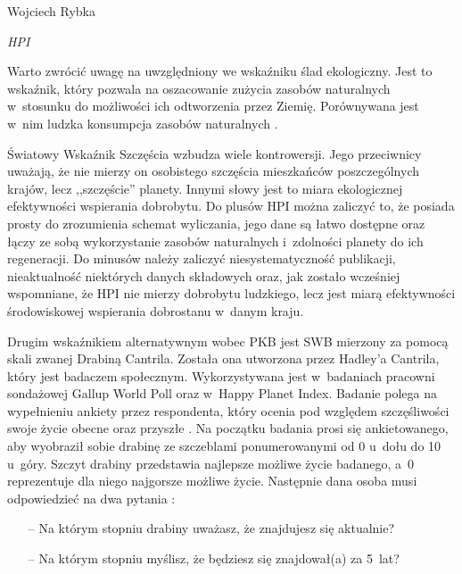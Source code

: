 \begin{artplenv}{Wojciech Rybka}
\begin{footnotesize}
\begin{widerequation}
\textit{HPI}\ {\approx}\ 
\end{widerequation}
\end{footnotesize}

Warto zwrócić uwagę na uwzględniony we wskaźniku ślad ekologiczny. Jest to wskaźnik, który pozwala na oszacowanie
zużycia zasobów naturalnych w~stosunku do możliwości ich odtworzenia przez Ziemię. Porównywana jest w~nim ludzka
konsumpcja zasobów naturalnych
\parencite{noauthor_about_2019}.

Światowy Wskaźnik Szczęścia wzbudza wiele kontrowersji. Jego przeciwnicy uważają, że nie mierzy on osobistego szczęścia
mieszkańców poszczególnych krajów, lecz ,,szczęście'' planety. Innymi słowy jest to miara ekologicznej efektywności
wspierania dobrobytu. Do plusów HPI można zaliczyć to, że posiada prosty do zrozumienia schemat wyliczania, jego dane
są łatwo dostępne oraz łączy ze sobą wykorzystanie zasobów naturalnych i~zdolności planety do ich regeneracji. Do
minusów należy zaliczyć niesystematyczność publikacji, nieaktualność niektórych danych składowych oraz, jak zostało
wcześniej wspomniane, że HPI nie mierzy dobrobytu ludzkiego, lecz jest miarą efektywności środowiskowej wspierania
dobrostanu w~danym kraju. 

Drugim wskaźnikiem alternatywnym wobec PKB jest SWB mierzony za pomocą skali zwanej Drabiną Cantrila. Została ona
utworzona przez Hadley'a Cantrila, który jest badaczem społecznym. Wykorzystywana jest w~badaniach pracowni sondażowej
Gallup World Poll oraz w~Happy Planet Index. Badanie polega na wypełnieniu ankiety przez respondenta, który ocenia pod
względem szczęśliwości swoje życie obecne oraz przyszłe
\parencite{krok_metody_2016}.
Na początku badania
prosi się ankietowanego, aby wyobraził sobie drabinę ze szczeblami ponumerowanymi od 0 u~dołu do 10 u~góry. Szczyt
drabiny przedstawia najlepsze możliwe życie badanego, a~0 reprezentuje dla niego najgorsze możliwe życie. Następnie
dana osoba musi odpowiedzieć na dwa pytania
\parencite{gallup_inc._understanding_2019}:

\begin{itemize}
	\item[--] Na którym stopniu drabiny uważasz, że znajdujesz się aktualnie?
	\item[--] Na którym stopniu myślisz, że będziesz się znajdował(a) za 5~lat?
\end{itemize}


\end{artplenv}
